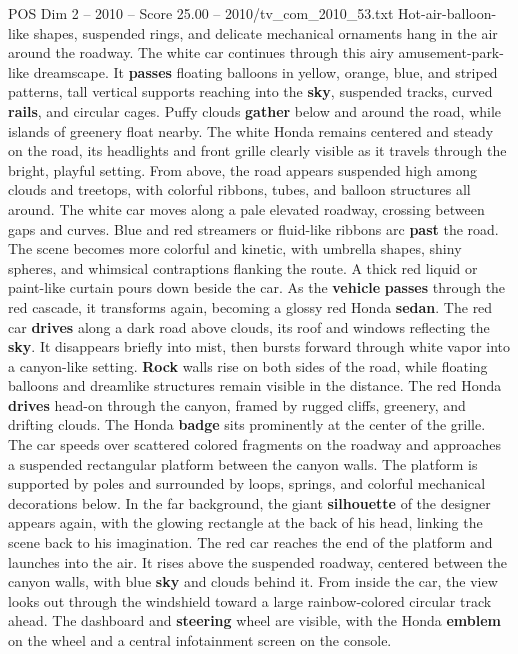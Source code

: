 \begin{textsample}{POS Dim 2 – 2010 – Score 25.00 – 2010/tv\_com\_2010\_53.txt}
Hot-air-balloon-like shapes, suspended rings, and delicate mechanical ornaments hang in the air around the roadway.
The white car continues through this airy amusement-park-like dreamscape.
It \textbf{passes} floating balloons in yellow, orange, blue, and striped patterns, tall vertical supports reaching into the \textbf{sky}, suspended tracks, curved \textbf{rails}, and circular cages.
Puffy clouds \textbf{gather} below and around the road, while islands of greenery float nearby.
The white Honda remains centered and steady on the road, its headlights and front grille clearly visible as it travels through the bright, playful setting.
From above, the road appears suspended high among clouds and treetops, with colorful ribbons, tubes, and balloon structures all around.
The white car moves along a pale elevated roadway, crossing between gaps and curves.
Blue and red streamers or fluid-like ribbons arc \textbf{past} the road.
The scene becomes more colorful and kinetic, with umbrella shapes, shiny spheres, and whimsical contraptions flanking the route.
A thick red liquid or paint-like curtain pours down beside the car.
As the \textbf{vehicle} \textbf{passes} through the red cascade, it transforms again, becoming a glossy red Honda \textbf{sedan}.
The red car \textbf{drives} along a dark road above clouds, its roof and windows reflecting the \textbf{sky}.
It disappears briefly into mist, then bursts forward through white vapor into a canyon-like setting. \textbf{Rock} walls rise on both sides of the road, while floating balloons and dreamlike structures remain visible in the distance.
The red Honda \textbf{drives} head-on through the canyon, framed by rugged cliffs, greenery, and drifting clouds.
The Honda \textbf{badge} sits prominently at the center of the grille.
The car speeds over scattered colored fragments on the roadway and approaches a suspended rectangular platform between the canyon walls.
The platform is supported by poles and surrounded by loops, springs, and colorful mechanical decorations below.
In the far background, the giant \textbf{silhouette} of the designer appears again, with the glowing rectangle at the back of his head, linking the scene back to his imagination.
The red car reaches the end of the platform and launches into the air.
It rises above the suspended roadway, centered between the canyon walls, with blue \textbf{sky} and clouds behind it.
From inside the car, the view looks out through the windshield toward a large rainbow-colored circular track ahead.
The dashboard and \textbf{steering} wheel are visible, with the Honda \textbf{emblem} on the wheel and a central infotainment screen on the console.

\end{textsample}
